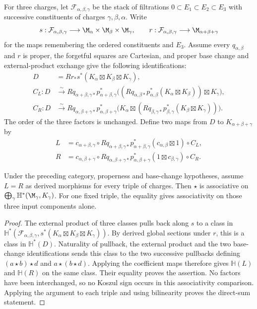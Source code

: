 For three charges, let $\mathcal F_{\alpha,\beta,\gamma}$ be the stack of
filtrations $0\subset E_1\subset E_2\subset E_3$ with successive
constituents of charges $\gamma,\beta,\alpha$. Write
\[
 s:\mathcal F_{\alpha,\beta,\gamma}\longrightarrow
 \M_\alpha\times\M_\beta\times\M_\gamma,
 \qquad r:\mathcal F_{\alpha,\beta,\gamma}\longrightarrow
 \M_{\alpha+\beta+\gamma}
\]
for the maps remembering the ordered constituents and $E_3$. Assume every $q_{\alpha,\beta}$ and $r$ is proper, the forgetful squares
are Cartesian, and proper base change and external-product exchange give
the following identifications:
\[
 \begin{aligned}
 D&=Rr_*s^*(K_\alpha\boxtimes K_\beta\boxtimes K_\gamma),\\
 C_L:D&\xrightarrow{\sim}Rq_{\alpha+\beta,\gamma*}
 p_{\alpha+\beta,\gamma}^*
 \bigl((Rq_{\alpha,\beta*}p_{\alpha,\beta}^*
 (K_\alpha\boxtimes K_\beta))\boxtimes K_\gamma\bigr),\\
 C_R:D&\xrightarrow{\sim}Rq_{\alpha,\beta+\gamma*}
 p_{\alpha,\beta+\gamma}^*
 \bigl(K_\alpha\boxtimes(Rq_{\beta,\gamma*}p_{\beta,\gamma}^*
 (K_\beta\boxtimes K_\gamma))\bigr).
 \end{aligned}
\]
The order of the three factors is unchanged. Define two maps from $D$ to
$K_{\alpha+\beta+\gamma}$ by
\[
 \begin{aligned}
 L&=c_{\alpha+\beta,\gamma}\circ
 Rq_{\alpha+\beta,\gamma*}p_{\alpha+\beta,\gamma}^*
 (c_{\alpha,\beta}\boxtimes1)\circ C_L,\\
 R&=c_{\alpha,\beta+\gamma}\circ
 Rq_{\alpha,\beta+\gamma*}p_{\alpha,\beta+\gamma}^*
 (1\boxtimes c_{\beta,\gamma})\circ C_R.
 \end{aligned}
\]

\begin{theorem}
\label{thm:hall-coefficient-compatibility}
Under the preceding category, properness and base-change hypotheses, assume
$L=R$ as derived morphisms for every triple of charges. Then $\star$ is
associative on $\bigoplus_\gamma\mathbb H^*(\M_\gamma,K_\gamma)$.
For one fixed triple, the equality gives associativity on those three input
components alone.
\end{theorem}
\begin{proof}
The external product of three classes pulls back along $s$ to a class in
$\mathbb H^*(\mathcal F_{\alpha,\beta,\gamma},
s^*(K_\alpha\boxtimes K_\beta\boxtimes K_\gamma))$.
By derived global sections under $r$, this is a class in $\mathbb H^*(D)$.
Naturality of pullback, the external product and the two base-change
identifications sends this class to the two successive pullbacks defining
$(a\star b)\star d$ and $a\star(b\star d)$. Applying the coefficient maps
therefore gives $\mathbb H(L)$ and $\mathbb H(R)$ on the same class. Their
equality proves the assertion. No factors have been interchanged, so no
Koszul sign occurs in this associativity comparison. Applying the argument
to each triple and using bilinearity proves the direct-sum statement.
\end{proof}


